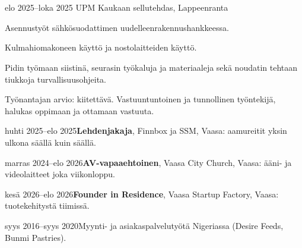 \documentclass[a4paper,11pt]{article}
\begin{document}
\section{}
\begin{cventry}{elo 2025--loka 2025}{}
  UPM Kaukaan sellutehdas, Lappeenranta\par
  Asennustyöt sähkösuodattimen uudelleenrakennushankkeessa.\par
  Kulmahiomakoneen käyttö ja nostolaitteiden käyttö.\par
  Pidin työmaan siistinä, seurasin työkaluja ja materiaaleja sekä noudatin tehtaan tiukkoja turvallisuusohjeita.\par
  Työnantajan arvio: kiitettävä. Vastuuntuntoinen ja tunnollinen työntekijä, halukas oppimaan ja ottamaan vastuuta.
\end{cventry}
\begin{cventry}{huhti 2025--elo 2025}{\textbf{Lehdenjakaja}, Finnbox ja SSM, Vaasa: aamureitit yksin ulkona säällä kuin säällä.}
\end{cventry}
\begin{cventry}{marras 2024--elo 2026}{\textbf{AV-vapaaehtoinen}, Vaasa City Church, Vaasa: ääni- ja videolaitteet joka viikonloppu.}
\end{cventry}
\begin{cventry}{kesä 2026--elo 2026}{\textbf{Founder in Residence}, Vaasa Startup Factory, Vaasa: tuotekehitystä tiimissä.}
\end{cventry}
\begin{cventry}{syys 2016--syys 2020}{Myynti- ja asiakaspalvelutyötä Nigeriassa (Desire Feeds, Bunmi Pastries).}
\end{cventry}

\section{}

\section{}
\end{document}
